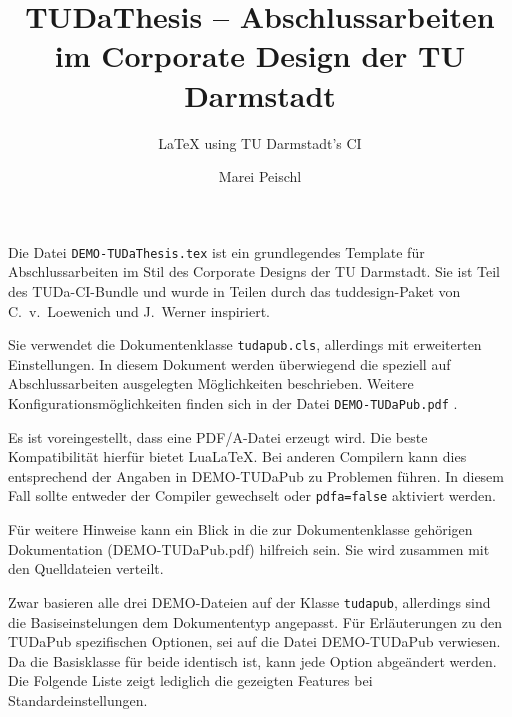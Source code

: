 \documentclass[
	german,%
	accentcolor=9c,%
	ruledheaders=section,%
	class=report,%
	thesis={type=bachelor},%
	fontsize=11pt,%
	parskip=half-,%
	custommargins=true,%
	marginpar=false,%
]{tudapub}
\title{TUDaThesis -- Abschlussarbeiten im Corporate Design der TU Darmstadt}
\subtitle{\LaTeX{} using TU Darmstadt's CI}
\author{Marei Peischl}
\institute{Institut}
\newcommand*{\file}[1]{\texttt{#1}}
\newcommand*{\code}[1]{\texttt{#1}}
\begin{document}
\maketitle


\tableofcontents



Die Datei \file{DEMO-TUDaThesis.tex} ist ein grundlegendes Template für Abschlussarbeiten im Stil des Corporate Designs der TU Darmstadt.
Sie ist Teil des TUDa-CI-Bundle und wurde in Teilen durch das tuddesign-Paket von C.~v.~Loewenich und J.~Werner inspiriert.


Sie verwendet die Dokumentenklasse \file{tudapub.cls}, allerdings mit erweiterten Einstellungen. In diesem Dokument werden überwiegend die speziell auf Abschlussarbeiten ausgelegten Möglichkeiten beschrieben. Weitere Konfigurationsmöglichkeiten finden sich in der Datei \file{DEMO-TUDaPub.pdf} \cite{tudapub}.

Es ist voreingestellt, dass eine PDF/A-Datei erzeugt wird. Die beste Kompatibilität hierfür bietet Lua\LaTeX. Bei anderen Compilern kann dies entsprechend der Angaben in DEMO-TUDaPub zu Problemen führen. In diesem Fall sollte entweder der Compiler gewechselt oder \code{pdfa=false} aktiviert werden.

Für weitere Hinweise kann ein Blick in die zur Dokumentenklasse gehörigen Dokumentation (DEMO-TUDaPub.pdf) hilfreich sein. Sie wird zusammen mit den Quelldateien verteilt.

Zwar basieren alle drei DEMO-Dateien auf der Klasse \code{tudapub}, allerdings sind die Basiseinstelungen dem Dokumententyp angepasst.
Für Erläuterungen zu den TUDaPub spezifischen Optionen, sei auf die Datei DEMO-TUDaPub verwiesen.
Da die Basisklasse für beide identisch ist, kann jede Option abgeändert werden. Die Folgende Liste zeigt lediglich die gezeigten Features bei Standardeinstellungen.
\end{document}
